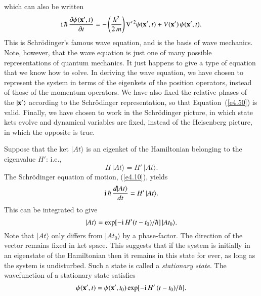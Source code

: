 which can also be written
\begin{equation}\label{e4.54}
{\rm i}\,\hbar\,\frac{\partial \psi({\bf x}', t)}{\partial t}
= -  \left(\frac{\hbar^2}{2\,m}\right)
\nabla'^{\,2}\psi({\bf x}', t) + V({\bf x'})\, \psi({\bf x'}, t).
\end{equation}
This is Schr\"{o}dinger's famous wave equation, and is the basis of
wave mechanics. Note, however, that the wave equation is 
just one of many possible representations of quantum mechanics. It just happens
to give a type of equation that we know how to solve. In deriving the wave equation, we have chosen to represent the system in terms of the eigenkets of
the position operators, instead of those of the momentum operators. We have
also fixed the relative phases of the $|{\bf x'}\rangle$ according to 
the Schr\"{o}dinger  representation, so that Equation~(\ref{e4.50}) is valid.  Finally, we
have chosen to work in the Schr\"{o}dinger picture, in which state kets evolve
and dynamical variables are fixed, instead of the Heisenberg picture,
in which the opposite is true. 

Suppose that the ket $|At\rangle$ is an eigenket of the Hamiltonian
belonging to the eigenvalue $H'$: i.e., 
\begin{equation}
H\,|At\rangle = H'\,|At\rangle.
\end{equation}
The Schr\"{o}dinger equation of motion, (\ref{e4.10}), yields
\begin{equation}
{\rm i}\,\hbar \,\frac{d |At\rangle}{dt} = H'\, |At\rangle.
\end{equation}
This can be integrated to give
\begin{equation}
|At\rangle = \exp[ -{\rm i}\,H'(t-t_0)/\hbar]\, |At_0\rangle.
\end{equation}
Note that $|At\rangle$ only differs from $|At_0\rangle$ by a phase-factor. The direction of the vector remains fixed in ket space. This
suggests that if the system is initially in an eigenstate of the
Hamiltonian then it remains in this state for ever, as long as the system
is undisturbed. Such a state is called a {\em stationary state}. The wavefunction
of a stationary state satisfies 
\begin{equation}
\psi({\bf x}', t) = \psi({\bf x'}, t_0) \exp[ -{\rm i}\,H'\,(t-t_0)/\hbar].
\end{equation}


